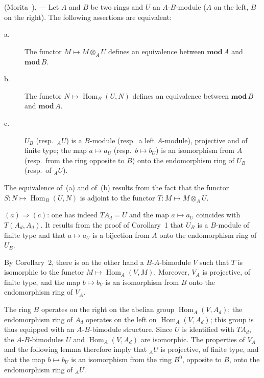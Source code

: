 \begin{corollary}
(Morita~\cite{morita}). --- Let $A$ and $B$ be two rings and
$U$ an $A$-$B$-module ($A$ on the left, $B$ on the right).  The
following assertions are equivalent:
\begin{description}
\item[\normalfont a.] The functor $M\mapsto M\otimes_A U$ defines an
      equivalence between $\mathbf{mod}\,A$ and $\mathbf{mod}\,B$.
\item[\normalfont b.] The functor $N\mapsto\operatorname{Hom}_B(U,N)$
      defines an equivalence between $\mathbf{mod}\,B$ and
      $\mathbf{mod}\,A$.
\item[\normalfont c.] $U_B$ (resp.\ ${}_AU$) is a $B$-module (resp.\ a
      left $A$-module), projective and of finite type; the map
      $a\mapsto a_U$ (resp.\ $b\mapsto b_U$) is an isomorphism from $A$
      (resp.\ from the ring opposite to $B$) onto the endomorphism ring
      of $U_B$ (resp.\ of ${}_AU$).
\end{description}
\end{corollary}

The equivalence of~(a) and of~(b) results from the fact that the
functor $S\colon N\mapsto\operatorname{Hom}_B(U,N)$ is adjoint to the
functor $T\colon M\mapsto M\otimes_A U$.

$(a)\Rightarrow(c)$: one has indeed $TA_d=U$ and the map
$a\mapsto a_U$ coincides with $T(A_d,A_d)$.  It results from the proof
of Corollary~1 that $U_B$ is a $B$-module of finite type and that
$a\mapsto a_U$ is a bijection from $A$ onto the endomorphism ring of
$U_B$.

By Corollary~2, there is on the other hand a $B$-$A$-bimodule $V$ such
that $T$ is isomorphic to the functor $M\mapsto\operatorname{Hom}_A(V,M)$.
Moreover, $V_A$ is projective, of finite type, and the map
$b\mapsto b_V$ is an isomorphism from $B$ onto the endomorphism ring
of $V_A$.

The ring $B$ operates on the right on the abelian group
$\operatorname{Hom}_A(V,A_d)$; the endomorphism ring of $A_d$ operates
on the left on $\operatorname{Hom}_A(V,A_d)$; this group is thus
equipped with an $A$-$B$-bimodule structure.  Since $U$ is identified
with $TA_d$, the $A$-$B$-bimodules $U$ and
$\operatorname{Hom}_A(V,A_d)$ are isomorphic.  The properties of $V_A$
and the following lemma therefore imply that ${}_AU$ is projective,
of finite type, and that the map $b\mapsto b_U$ is an isomorphism from
the ring $B^0$, opposite to $B$, onto the endomorphism ring of
${}_AU$.

